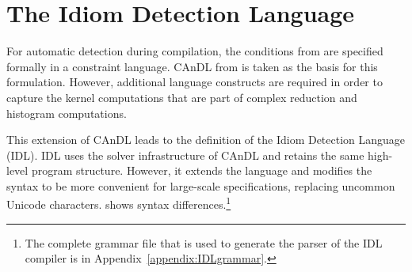 \section{The Idiom Detection Language}

    For automatic detection during compilation, the conditions from
     are specified formally in
    a constraint language.
    CAnDL from  is taken as the basis for this formulation.
    However, additional language constructs are required in order to capture
    the kernel computations that are part of complex reduction and histogram
    computations.

    This extension of CAnDL leads to the definition of the
    Idiom Detection Language (IDL).
    IDL uses the solver infrastructure of CAnDL and retains the same high-level
    program structure.
    However, it extends the language and modifies the syntax to be more
    convenient for large-scale specifications, replacing uncommon Unicode
    characters.
     shows syntax differences.\footnote{The complete grammar
    file that is used to generate the parser of the IDL compiler is in
    Appendix~\ref{appendix:IDLgrammar}.}

